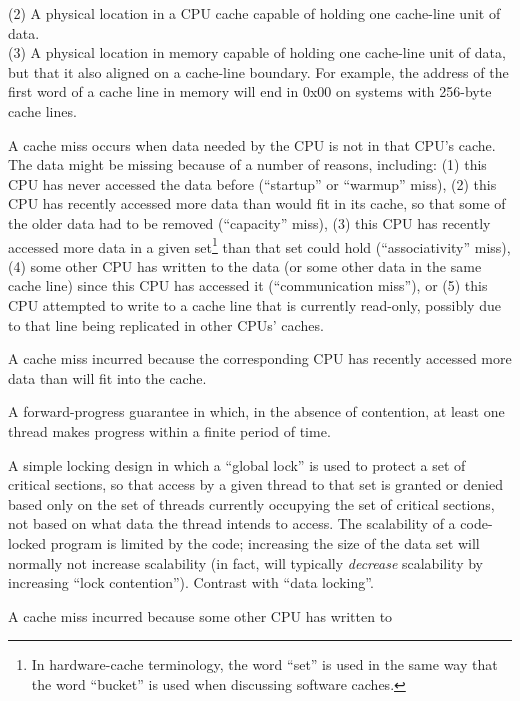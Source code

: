 \begin{description}
	(2) A physical location in a CPU cache capable of holding
	one cache-line unit of data. \\
	(3) A physical location in memory capable of holding one
	cache-line unit of data, but that it also aligned
	on a cache-line boundary.
	For example, the address of the first word of a cache line
	in memory will end in 0x00 on systems with 256-byte cache lines.
\item[\IX{Cache Miss}:]
	A cache miss occurs when data needed by the CPU is not in
	that CPU's cache.
	The data might be missing because of a number of reasons,
	including:
	(1) this CPU has never accessed the data before
	(``startup'' or ``warmup'' miss),
	(2) this CPU has recently accessed more
	data than would fit in its cache, so that some of the older
	data had to be removed (``capacity'' miss),
	(3) this CPU
	has recently accessed more data in a given set\footnote{
		In hardware-cache terminology, the word ``set''
		is used in the same way that the word ``bucket''
		is used when discussing software caches.}
	than that set could hold (``associativity'' miss),
	(4) some other CPU has written to the data (or some other
	data in the same cache line) since this CPU has accessed it
	(``communication miss''), or
	(5) this CPU attempted to write to a cache line that is
	currently read-only, possibly due to that line being replicated
	in other CPUs' caches.
\item[\IXalthalt{Capacity Miss}{capacity}{cache miss}:]
	A cache miss incurred because the corresponding CPU has recently
	accessed more data than will fit into the cache.
\item[\IX{Clash Free}:]
	A forward-progress guarantee in which, in the absence of
	contention, at least one thread makes progress within a finite
	period of time.
\item[\IXalth{Code Locking}{code}{locking}:]
	A simple locking design in which a ``global lock'' is used to protect
	a set of critical sections, so that access by a given thread
	to that set is
	granted or denied based only on the set of threads currently
	occupying the set of critical sections, not based on what
	data the thread intends to access.
	The scalability of a code-locked program is limited by the code;
	increasing the size of the data set will normally not increase
	scalability (in fact, will typically \emph{decrease} scalability
	by increasing ``lock contention'').
	Contrast with ``data locking''.
\item[\IXalth{Communication Miss}{communication}{cache miss}:]
	A cache miss incurred because some other CPU has written to

\end{description}

